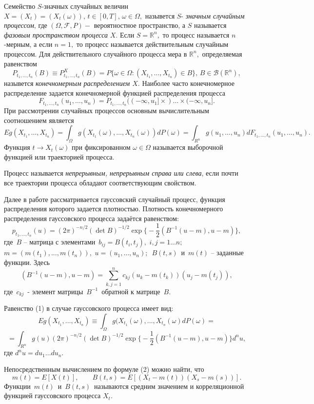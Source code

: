 \documentclass [12pt]{report}
\begin{document}
Семейство $S$-значных случайных величин $X=(X_t)=(X_t(\omega)), \, t\in [0,T], \, \omega\in \Omega,$ назывется $S$-
\emph{значным случайным процессом}, где $(\Omega,\mathcal{F},P)-$ вероятностное пространство, а $S$ называется
 \emph{фазовым пространством
процесса} $X.$ Если $S=\mathbb{R}^n,$ то процесс называется
$n$-мерным, а если $n=1,$ то процесс называется действительным
случайным процессом. Для действительного случайного процесса
мера в $\mathbb{R}^n,$ определяемая равенством
$$
P_{t_1,\ldots,t_n}(B)\equiv P^X_{t_1,\ldots,t_n}(B)=
P\{\omega\in \Omega:(X_{t_1},\ldots,X_{t_n})\in B\}, \,
B\in \mathcal{B}(\mathbb{R}^n),
$$
назывется \emph{конечномерным
распределением $X.$}
 Наиболее часто конечномерное распределение задается конечномерной функцией распределения процесса
$$
F_{t_1,\ldots,t_n}(u_1,\ldots,u_n)=
P_{t_1,\ldots,t_n}((-\infty,u_1]\times)\ldots\times(-\infty,u_n].
$$
При рассмотрении случайных процессов основным вычислительным соотношением
является
$$
Eg(X_{t_1},\ldots,X_{t_n})=
\int_{\Omega}g(X_{t_1}(\omega),\ldots,X_{t_n}(\omega))dP(\omega)=
\int_{R^n}g(u_1,\ldots,u_n)dF_{t_1,\ldots,t_n}(u_1,\ldots,u_n).
$$
Функция $t\rightarrow X_t(\omega)$ при фиксированном
$\omega\in \Omega$ называется выборочной функцией или траекторией
процесса.

   Процесс называется \emph{непрерывным, непрерывным справа или
слева}, если почти все траектории процесса обладают соответствующим
свойством.

Далее в работе рассматривается гауссовский случайный процесс, функция распределения которого задается плотностью.
Плотность конечномерного распределения гауссовского процесса задаётся равенством:
$$p_{t_1,...,t_n}(u)=
(2\pi)^{-n/2}(\det B)^{-1/2}\exp\Big\{-\frac{1}{2}(B^{-1}(u-m),u-m)\Big\},$$
где $\,B$ -- матрица с элементами $\, b_{ij}=B(t_i,t_j), \,\,i,j=1...n;$
$m=(m(t_1),...,m(t_n)),$ $u=(u_1,\ldots,u_n);$ $\,  B(t,s)\,$ и
$ \,m(t)$ -- заданные функции.
Здесь
$$(B^{-1}(u-m),u-m) = \sum_{k,j=1}^n c_{kj}(u_k-m(t_k))(u_j-m(t_j)),$$
где $\,c_{kj}\,$ - элемент матрицы $\,B^{-1}\,$ обратной к матрице $\,B.$

Равенство (1) в случае гауссовского процесса имеет вид:
$$Eg(X_{t_1},...,X_{t_n})\equiv
\int_{\Omega}g(X_{t_1}(\omega),...,X_{t_n}(\omega)dP(\omega)=
$$
$$
=\int_{R^n}g(u)(2\pi)^{-n/2}(\det B)^{-1/2}
\exp\Big\{-\frac{1}{2}(B^{-1}(u-m),u-m)\Big\}d^n u,
$$
где $d^n u=du_1\ldots du_n.$

Непосредственным вычислением по формуле (2) можно найти, что
$$m(t)=E[X(t)], \qquad B(t,s)=E[(X_t-m(t))(X_s-m(s))].$$
Функции $\,m(t)\,$ и $\,B(t,s)\,$ называются средним значением и
корреляционной функцией гауссовского процесса $X_t.$
\end{document}
